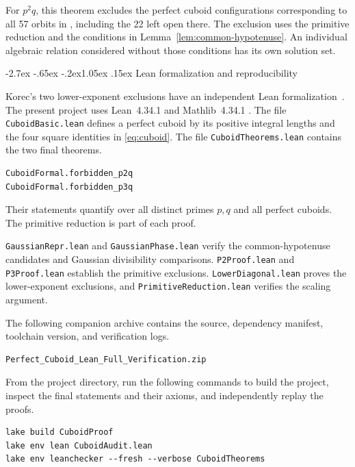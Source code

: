 \documentclass[11pt,a4paper,twoside]{article}
\makeatletter
\numberwithin{equation}{section}
\renewcommand{\section}{\@startsection{section}{1}{\z@}%
  {-2.7ex \@plus -.65ex \@minus -.2ex}{1.05ex \@plus .15ex}%
  {\normalfont\large\bfseries}}
\makeatother
\begin{document}
For \(p^2q\), this theorem excludes the perfect cuboid configurations corresponding to all 57 orbits in \cite{ref2}, including the 22 left open there. The exclusion uses the primitive reduction and the conditions in Lemma~\ref{lem:common-hypotenuse}. An individual algebraic relation considered without those conditions has its own solution set.

\section{Lean formalization and reproducibility}
\label{sec:lean}

Korec's two lower-exponent exclusions have an independent Lean formalization~\cite{ref5}. The present project uses Lean~4.34.1 \cite{ref6} and Mathlib~4.34.1 \cite{ref7}. The file \texttt{CuboidBasic.\allowbreak{}lean} defines a perfect cuboid by its positive integral lengths and the four square identities in \eqref{eq:cuboid}. The file \texttt{CuboidTheorems.\allowbreak{}lean} contains the two final theorems.
\begin{verbatim}
CuboidFormal.forbidden_p2q
CuboidFormal.forbidden_p3q
\end{verbatim}
Their statements quantify over all distinct primes \(p,q\) and all perfect cuboids. The primitive reduction is part of each proof.

\texttt{GaussianRepr.\allowbreak{}lean} and \texttt{GaussianPhase.\allowbreak{}lean} verify the common-hypotenuse candidates and Gaussian divisibility comparisons. \texttt{P2Proof.\allowbreak{}lean} and \texttt{P3Proof.\allowbreak{}lean} establish the primitive exclusions. \texttt{LowerDiagonal.\allowbreak{}lean} proves the lower-exponent exclusions, and \texttt{PrimitiveReduction.\allowbreak{}lean} verifies the scaling argument.

The following companion archive contains the source, dependency manifest, toolchain version, and verification logs.
\begin{verbatim}
Perfect_Cuboid_Lean_Full_Verification.zip
\end{verbatim}

From the project directory, run the following commands to build the project, inspect the final statements and their axioms, and independently replay the proofs.

\begin{verbatim}
lake build CuboidProof
lake env lean CuboidAudit.lean
lake env leanchecker --fresh --verbose CuboidTheorems
\end{verbatim}
\end{document}
